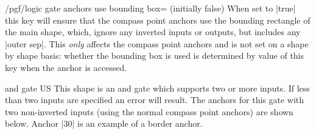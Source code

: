 \begin{key}{/pgf/logic gate anchors use bounding box= (initially false)}
When set to |true| this key will ensure that the 
compass point anchors use the bounding rectangle of the
main shape, which, ignore any inverted inputs or outputs, but
includes any |outer sep|. 
This \emph{only} affects the compass point anchors
and is not set on a shape by shape basis: whether the bounding
box is used is determined by value of this key when the anchor
is accessed.

\begin{codeexample}[]
\end{codeexample} 



\end{key}




\begin{shape}{and gate US}
  This shape is an and gate which supports two or more inputs. If
	less than two inputs are specified an error will result. 
	The anchors for this gate with two
  non-inverted inputs (using the normal compass point anchors) are
  shown below. Anchor |30| is an example of a border anchor.
  
\begin{codeexample}[]
\Huge
{}
\end{codeexample}
\end{shape}

